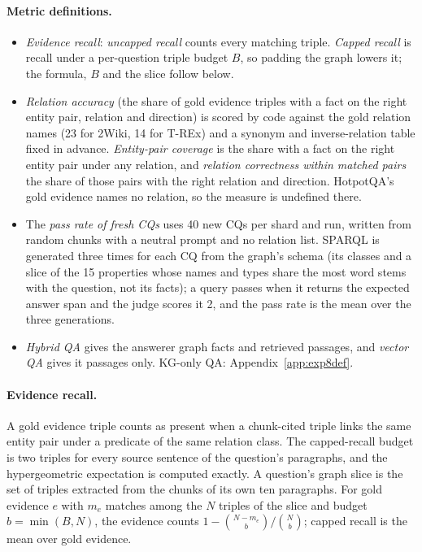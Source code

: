 \paragraph{Metric definitions.}\label{app:metricdefs}
\begin{itemize}
  \item \emph{Evidence recall}: \emph{uncapped recall} counts every matching triple. \emph{Capped recall} is recall under a per-question triple budget $B$, so padding the graph lowers it; the formula, $B$ and the slice follow below.
  \item \emph{Relation accuracy} (the share of gold evidence triples with a fact on the right entity pair, relation and direction) is scored by code against the gold relation names (23 for 2Wiki, 14 for T-REx) and a synonym and inverse-relation table fixed in advance. \emph{Entity-pair coverage} is the share with a fact on the right entity pair under any relation, and \emph{relation correctness within matched pairs} the share of those pairs with the right relation and direction. HotpotQA's gold evidence names no relation, so the measure is undefined there.
  \item The \emph{pass rate of fresh CQs} uses 40 new CQs per shard and run, written from random chunks with a neutral prompt and no relation list. SPARQL is generated three times for each CQ from the graph's schema (its classes and a slice of the 15 properties whose names and types share the most word stems with the question, not its facts); a query passes when it returns the expected answer span and the judge scores it 2, and the pass rate is the mean over the three generations.
  \item \emph{Hybrid QA} gives the answerer graph facts and retrieved passages, and \emph{vector QA} gives it passages only. KG-only QA: Appendix~\ref{app:exp8def}.
\end{itemize}

\paragraph{Evidence recall.} A gold evidence triple counts as present when a chunk-cited triple links the same entity pair under a predicate of the same relation class. The capped-recall budget is two triples for every source sentence of the question's paragraphs, and the hypergeometric expectation is computed exactly. A question's graph slice is the set of triples extracted from the chunks of its own ten paragraphs. For gold evidence $e$ with $m_e$ matches among the $N$ triples of the slice and budget $b=\min(B,N)$, the evidence counts $1-\binom{N-m_e}{b}/\binom{N}{b}$; capped recall is the mean over gold evidence.

